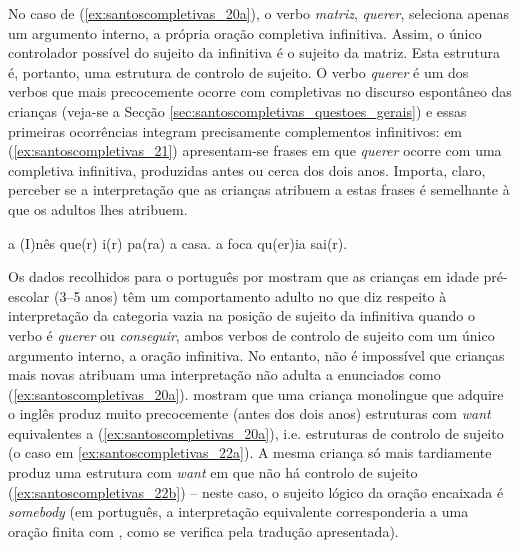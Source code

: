 \documentclass[output=paper]{LSP/langsci}
\begin{document}
No caso de (\ref{ex:santoscompletivas_20a}), o verbo \textit{matriz},  \textit{querer}, seleciona apenas um argumento interno, a própria oração completiva infinitiva. Assim, o único controlador possível do sujeito da infinitiva é o sujeito da matriz. Esta estrutura é, portanto, uma estrutura de controlo de sujeito. O verbo \textit{querer} é um dos verbos que mais precocemente ocorre com completivas no discurso espontâneo das crianças (veja-se a Secção \ref{sec:santoscompletivas_questoes_gerais}) e essas primeiras ocorrências integram precisamente complementos infinitivos: em (\ref{ex:santoscompletivas_21}) apresentam-se frases em que \textit{querer} ocorre com uma completiva infinitiva, produzidas antes ou cerca dos dois anos. Importa, claro, perceber se a interpretação que as crianças atribuem a estas frases é semelhante à que os adultos lhes atribuem.

\ea\label{ex:santoscompletivas_21}
\ea\label{ex:santoscompletivas_21a} a  (I)nês que(r) i(r) pa(ra) a casa.
\ex\label{ex:santoscompletivas_21b} a foca qu(er)ia sai(r).
\zl

Os dados recolhidos para o português por \citet{agostinho2014} mostram que as crianças em idade pré-escolar (3--5 anos) têm um comportamento adulto no que diz respeito à interpretação da categoria vazia na posição de sujeito da infinitiva quando o verbo é \textit{querer} ou \textit{conseguir}, ambos verbos de controlo de sujeito com um único argumento interno, a oração infinitiva. No entanto, não é impossível que crianças mais novas atribuam uma interpretação não adulta a enunciados como (\ref{ex:santoscompletivas_20a}). \citet{landauthornton2011} mostram que uma criança monolingue que adquire o inglês produz muito precocemente (antes dos dois anos) estruturas com \textit{want} equivalentes a (\ref{ex:santoscompletivas_20a}), i.e. estruturas de controlo de sujeito (o caso em \ref{ex:santoscompletivas_22a}). A mesma criança só mais tardiamente produz uma estrutura com \textit{want} em que não há controlo de sujeito (\ref{ex:santoscompletivas_22b}) – neste caso, o sujeito lógico da oração encaixada é \textit{somebody} (em português, a interpretação equivalente corresponderia a uma oração finita com , como se verifica pela tradução apresentada).

\ea\label{ex:santoscompletivas_22}
\zl
\end{document}
